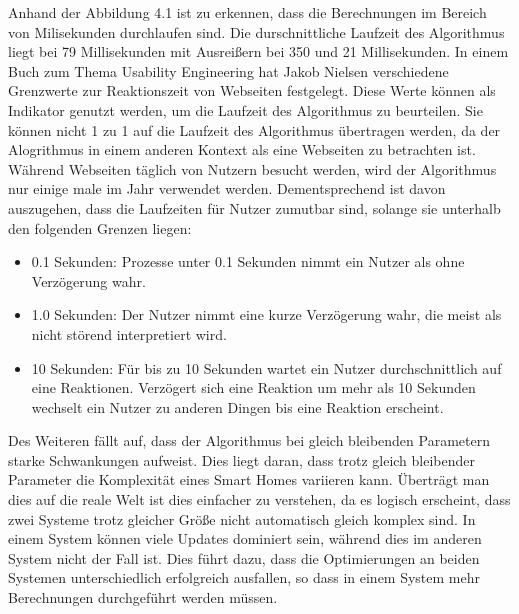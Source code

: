 \FloatBarrier
Anhand der Abbildung 4.1 ist zu erkennen, dass die Berechnungen im Bereich von Milisekunden durchlaufen sind. Die durschnittliche Laufzeit des Algorithmus liegt
bei 79 Millisekunden mit Ausreißern bei 350 und 21 Millisekunden. In einem Buch zum Thema Usability Engineering hat Jakob Nielsen verschiedene Grenzwerte zur
Reaktionszeit von Webseiten festgelegt. Diese Werte können als Indikator genutzt werden, um die Laufzeit des Algorithmus zu beurteilen. Sie können 
nicht 1 zu 1 auf die Laufzeit des Algorithmus übertragen werden, da der Alogrithmus in einem anderen Kontext als eine Webseiten zu betrachten ist.
Während Webseiten täglich von Nutzern besucht werden, wird der Algorithmus nur einige male im Jahr verwendet werden. Dementsprechend ist davon
auszugehen, dass die Laufzeiten für Nutzer zumutbar sind, solange sie unterhalb den folgenden Grenzen liegen:
\begin{itemize}
\item 0.1 Sekunden: Prozesse unter 0.1 Sekunden nimmt ein Nutzer als ohne Verzögerung wahr.
\item 1.0 Sekunden: Der Nutzer nimmt eine kurze Verzögerung wahr, die meist als nicht störend interpretiert wird.
\item 10 Sekunden: Für bis zu 10 Sekunden wartet ein Nutzer durchschnittlich auf eine Reaktionen. Verzögert sich eine Reaktion um mehr als 10 Sekunden wechselt ein Nutzer
zu anderen Dingen bis eine Reaktion erscheint.
\end{itemize}

Des Weiteren fällt auf, dass der Algorithmus bei gleich bleibenden Parametern starke Schwankungen aufweist. Dies liegt daran, dass trotz gleich
bleibender Parameter die Komplexität eines Smart Homes variieren kann. Überträgt man dies auf die reale Welt ist dies einfacher zu verstehen, da
es logisch erscheint, dass zwei Systeme trotz gleicher Größe nicht automatisch gleich komplex sind. In einem System können viele
Updates dominiert sein, während dies im anderen System nicht der Fall ist. Dies führt dazu, dass die Optimierungen an beiden Systemen unterschiedlich erfolgreich
ausfallen, so dass in einem System mehr Berechnungen durchgeführt werden müssen.

\newpage
